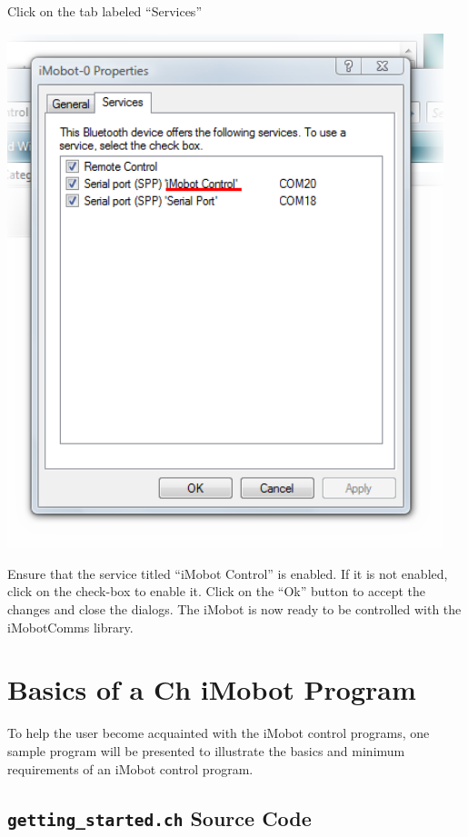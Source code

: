\documentclass{article}
\begin{document}
Click on the tab labeled ``Services''

\begin{center}
\includegraphics[width=5in]{images/imobot_connect_8.png}
\end{center}

Ensure that the service titled ``iMobot Control'' is enabled. If it is not
enabled, click on the check-box to enable it. Click on the ``Ok'' button to
accept the changes and close the dialogs. The iMobot is now ready to be
controlled with the iMobotComms library.

\section{Basics of a Ch iMobot Program}
To help the user become acquainted with the iMobot control programs, one sample
program will be presented to illustrate the basics and minimum requirements of
an iMobot control program. 

\subsection{\texttt{getting\_started.ch} Source Code}

\end{document}
